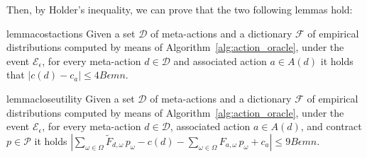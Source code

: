 %
%
Then, by Holder's inequality, we can prove that the two following lemmas hold:
%
%
\begin{restatable}{lemma}{costactions}\label{lem:cost_actions}
	Given a set $\mathcal{D}$ of meta-actions and a dictionary $\mathcal{F}$ of empirical distributions computed by means of Algorithm~\ref{alg:action_oracle}, under the event $\mathcal{E}_\epsilon$, for every meta-action $d \in \mathcal{D}$ and associated action $a \in A(d)$ it holds that $|c(d) - c_a| \le 4 B \epsilon m n$.
\end{restatable}
%
%
\begin{restatable}{lemma}{closeutility}\label{lem:utility_closed}
	Given a set $\mathcal{D}$ of meta-actions and a dictionary $\mathcal{F}$ of empirical distributions computed by means of Algorithm~\ref{alg:action_oracle}, under the event $\mathcal{E}_\epsilon$, for every meta-action $d \in \mathcal{D}$, associated action $a \in A(d)$, and contract $p \in \mathcal{P}$ it holds
	$
		| \sum_{\omega \in \Omega} \widetilde{F}_{d,\omega} \, p_\omega -c(d) - \sum_{\omega \in \Omega} F_{a, \omega} \, p_\omega + c_{a}  | \le 9B\epsilon m n.
	$
\end{restatable}





